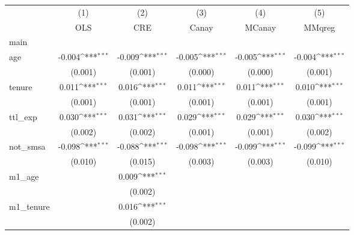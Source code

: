 
\def\sym#1{\ifmmode^{#1}\else\(^{#1}\)\fi}
\begin{tabular}{l*{5}{c}}
\hline\hline
            &\multicolumn{1}{c}{(1)}&\multicolumn{1}{c}{(2)}&\multicolumn{1}{c}{(3)}&\multicolumn{1}{c}{(4)}&\multicolumn{1}{c}{(5)}\\
            &\multicolumn{1}{c}{OLS}&\multicolumn{1}{c}{CRE}&\multicolumn{1}{c}{Canay}&\multicolumn{1}{c}{MCanay}&\multicolumn{1}{c}{MMqreg}\\
\hline
main        &                     &                     &                     &                     &                     \\
age         &      -0.004\sym{***}&      -0.009\sym{***}&      -0.005\sym{***}&      -0.005\sym{***}&      -0.004\sym{***}\\
            &     (0.001)         &     (0.001)         &     (0.000)         &     (0.000)         &     (0.001)         \\
 
tenure      &       0.011\sym{***}&       0.016\sym{***}&       0.011\sym{***}&       0.011\sym{***}&       0.010\sym{***}\\
            &     (0.001)         &     (0.001)         &     (0.001)         &     (0.001)         &     (0.001)         \\
 
ttl\_exp     &       0.030\sym{***}&       0.031\sym{***}&       0.029\sym{***}&       0.029\sym{***}&       0.030\sym{***}\\
            &     (0.002)         &     (0.002)         &     (0.001)         &     (0.001)         &     (0.002)         \\
 
not\_smsa    &      -0.098\sym{***}&      -0.088\sym{***}&      -0.098\sym{***}&      -0.099\sym{***}&      -0.099\sym{***}\\
            &     (0.010)         &     (0.015)         &     (0.003)         &     (0.003)         &     (0.010)         \\
 
m1\_age      &                     &       0.009\sym{***}&                     &                     &                     \\
            &                     &     (0.002)         &                     &                     &                     \\
 
m1\_tenure   &                     &       0.016\sym{***}&                     &                     &                     \\
            &                     &     (0.002)         &                     &                     &                     \\
 

\end{tabular}

